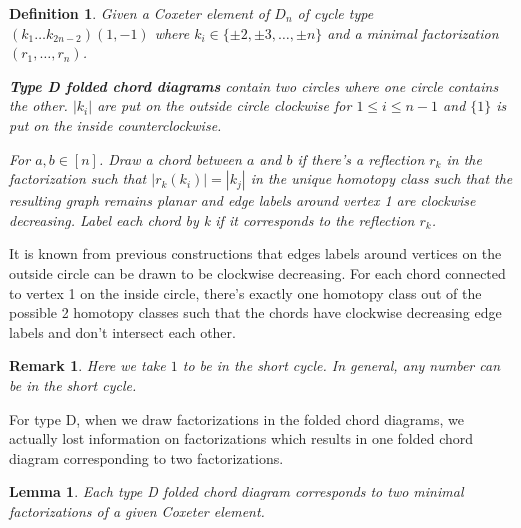 \documentclass[11pt]{amsart}
\newtheorem{defi}[thm]{Definition}%
\newtheorem{lemma}[thm]{Lemma}%
\newtheorem{rema}[thm]{Remark}%
\begin{document}
\begin{defi}
Given a Coxeter element of $D_n$ of cycle type $(k_1 \dots k_{2n-2})(1,-1)$ where $k_i \in \{\pm2, \pm3, \dots, \pm n\}$ and a minimal factorization $(r_1,\dots,r_n)$. 

\textbf{Type D folded chord diagrams} contain two circles where one circle contains the other. $|k_i|$ are put on the outside circle clockwise for $1 \leq i \leq {n-1}$ and $\{1\}$ is put on the inside counterclockwise.

For $a,b \in [n]$. Draw a chord between $a$ and $b$ if there's a reflection $r_k$ in the factorization such that $|r_k(k_i)|=|k_j|$ in the unique homotopy class such that the resulting graph remains planar and edge labels around vertex 1 are clockwise decreasing. Label each chord by k if it corresponds to the reflection $r_k$.
\end{defi}

It is known from previous constructions that edges labels around vertices on the outside circle can be drawn to be clockwise decreasing. For each chord connected to vertex 1 on the inside circle, there's exactly one homotopy class out of the possible 2 homotopy classes such that the chords have clockwise decreasing edge labels and don't intersect each other.

\begin{rema}
    Here we take $1$ to be in the short cycle. In general, any number can be in the short cycle.
\end{rema}

For type D, when we draw factorizations in the folded chord diagrams, we actually lost information on factorizations which results in one folded chord diagram corresponding to two factorizations.

\begin{lemma}
    Each type D folded chord diagram corresponds to two minimal factorizations of a given Coxeter element.
\end{lemma}
\end{document}
